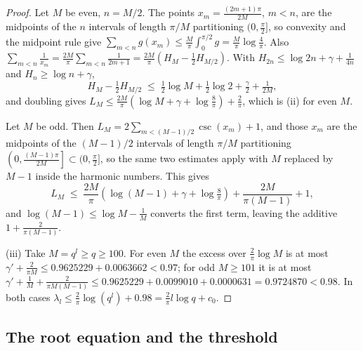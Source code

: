 \documentclass[11pt]{amsart}
\theoremstyle{definition}
\theoremstyle{remark}
\begin{document}
\begin{proof}
Let $M$ be even, $n = M/2$. The points $x_{m} = \frac{(2m+1)\pi}{2M}$, $m < n$, are the midpoints of the $n$ intervals of length $\pi/M$ partitioning $(0,\frac{\pi}{2}]$, so convexity and the midpoint rule give $\sum_{m<n} g(x_{m}) \le \frac{M}{\pi}\int_{0}^{\pi/2}g = \frac{M}{\pi}\log\frac{4}{\pi}$. Also $\sum_{m<n}\frac{1}{x_{m}} = \frac{2M}{\pi}\sum_{m<n}\frac{1}{2m+1} = \frac{2M}{\pi}\left(H_{M} - \tfrac12 H_{M/2}\right)$. With $H_{2n} \le \log 2n + \gamma + \frac{1}{4n}$ and $H_{n} \ge \log n + \gamma$,
\[
  H_{M} - \tfrac12 H_{M/2} \;\le\; \tfrac12\log M + \tfrac12\log 2 + \tfrac{\gamma}{2} + \tfrac{1}{2M},
\]
and doubling gives $L_{M} \le \frac{2M}{\pi}\left(\log M + \gamma + \log\frac{8}{\pi}\right) + \frac{2}{\pi}$, which is (ii) for even $M$.

Let $M$ be odd. Then $L_{M} = 2\sum_{m<(M-1)/2}\csc(x_{m}) + 1$, and those $x_{m}$ are the midpoints of the $(M-1)/2$ intervals of length $\pi/M$ partitioning $\left(0, \frac{(M-1)\pi}{2M}\right] \subset (0,\frac{\pi}{2}]$, so the same two estimates apply with $M$ replaced by $M-1$ inside the harmonic numbers. This gives
\[
  L_{M} \;\le\; \frac{2M}{\pi}\left(\log(M-1) + \gamma + \log\tfrac{8}{\pi}\right) + \frac{2M}{\pi(M-1)} + 1,
\]
and $\log(M-1) \le \log M - \frac{1}{M}$ converts the first term, leaving the additive $1 + \frac{2}{\pi(M-1)}$.

(iii) Take $M = q^{l} \ge q \ge 100$. For even $M$ the excess over $\frac{2}{\pi}\log M$ is at most $\gamma' + \frac{2}{\pi M} \le 0.9625229 + 0.0063662 < 0.97$; for odd $M \ge 101$ it is at most $\gamma' + \frac{1}{M} + \frac{2}{\pi M(M-1)} \le 0.9625229 + 0.0099010 + 0.0000631 = 0.9724870 < 0.98$. In both cases $\lambda_{l} \le \frac{2}{\pi}\log(q^{l}) + 0.98 = \frac{2}{\pi}l\log q + c_{0}$.
\end{proof}

\subsection{The root equation and the threshold}
\end{document}
